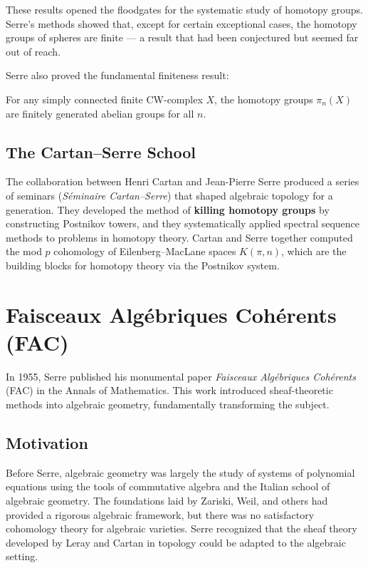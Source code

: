These results opened the floodgates for the systematic study of homotopy groups. Serre's methods showed that, except for certain exceptional cases, the homotopy groups of spheres are finite --- a result that had been conjectured but seemed far out of reach.

Serre also proved the fundamental finiteness result:

\begin{theorem}[Serre, 1953]
For any simply connected finite CW-complex \(X\), the homotopy groups \(\pi_n(X)\) are finitely generated abelian groups for all \(n\).
\end{theorem}

\subsection{The Cartan--Serre School}

The collaboration between Henri Cartan and Jean-Pierre Serre produced a series of seminars (\textit{S\'eminaire Cartan--Serre}) that shaped algebraic topology for a generation. They developed the method of \textbf{killing homotopy groups} by constructing Postnikov towers, and they systematically applied spectral sequence methods to problems in homotopy theory. Cartan and Serre together computed the mod \(p\) cohomology of Eilenberg--MacLane spaces \(K(\pi, n)\), which are the building blocks for homotopy theory via the Postnikov system.

\section{Faisceaux Alg\'ebriques Coh\'erents (FAC)}

In 1955, Serre published his monumental paper \textit{Faisceaux Alg\'ebriques Coh\'erents} (FAC) in the Annals of Mathematics. This work introduced sheaf-theoretic methods into algebraic geometry, fundamentally transforming the subject.

\subsection{Motivation}

Before Serre, algebraic geometry was largely the study of systems of polynomial equations using the tools of commutative algebra and the Italian school of algebraic geometry. The foundations laid by Zariski, Weil, and others had provided a rigorous algebraic framework, but there was no satisfactory cohomology theory for algebraic varieties. Serre recognized that the sheaf theory developed by Leray and Cartan in topology could be adapted to the algebraic setting.

